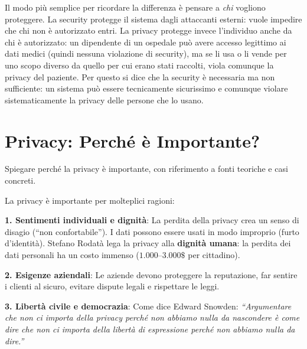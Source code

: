 \documentclass[a4paper,11pt]{article}
\begin{document}
\begin{nota}
Il modo pi\`{u} semplice per ricordare la differenza \`{e} pensare a \emph{chi} vogliono proteggere. La security protegge il sistema dagli attaccanti esterni: vuole impedire che chi non \`{e} autorizzato entri. La privacy protegge invece l'individuo anche da chi \`{e} autorizzato: un dipendente di un ospedale pu\`{o} avere accesso legittimo ai dati medici (quindi nessuna violazione di security), ma se li usa o li vende per uno scopo diverso da quello per cui erano stati raccolti, viola comunque la privacy del paziente. Per questo si dice che la security \`{e} necessaria ma non sufficiente: un sistema pu\`{o} essere tecnicamente sicurissimo e comunque violare sistematicamente la privacy delle persone che lo usano.
\end{nota}

\section{Privacy: Perch\'{e} \`{e} Importante?}

\begin{domanda}
Spiegare perch\'{e} la privacy \`{e} importante, con riferimento a fonti teoriche e casi concreti.
\end{domanda}

La privacy \`{e} importante per molteplici ragioni:

\textbf{1. Sentimenti individuali e dignit\`{a}}: La perdita della privacy crea un senso di disagio (``non confortabile''). I dati possono essere usati in modo improprio (furto d'identit\`{a}). Stefano Rodat\`{a} lega la privacy alla \textbf{dignit\`{a} umana}: la perdita dei dati personali ha un costo immenso ($1.000$--$3.000\$$ per cittadino).

\textbf{2. Esigenze aziendali}: Le aziende devono proteggere la reputazione, far sentire i clienti al sicuro, evitare dispute legali e rispettare le leggi.

\textbf{3. Libert\`{a} civile e democrazia}: Come dice Edward Snowden: \emph{``Argumentare che non ci importa della privacy perch\'{e} non abbiamo nulla da nascondere \`{e} come dire che non ci importa della libert\`{a} di espressione perch\'{e} non abbiamo nulla da dire.''}
\end{document}
